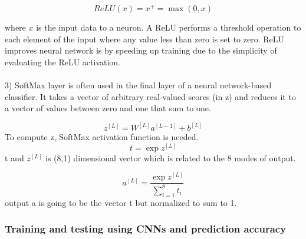 \begin{equation}
ReLU(x) = x^{+} = \max(0,x) 
\end{equation}

where $x$ is the input data to a neuron. A ReLU performs a threshold operation
to each element of the input where any value less than zero is set to zero. ReLU improves neural network is by speeding up training due to the simplicity of evaluating the ReLU activation.
\\
\\
3) SoftMax layer \cite{Ref29} is often used in the final layer of a neural network-based classifier.  It takes a vector of arbitrary real-valued scores (in z) and reduces it to a vector of values between zero and one that sum to one.

\begin{equation}
z^{[L]}=W^{[L]}a^{[L-1]}+b^{[L]} 
\end{equation}
To compute z, SoftMax activation function is needed.
\begin{equation}
t = \exp z^{[L]}
\end{equation}
t and $z^{[L]}$ is (8,1) dimensional vector which is related to the 8 modes of output.

\begin{equation}
a^{[L]} = \frac{\exp z^{[L]}}{\sum_{i=1}^{8} t_i} 
\end{equation}
output a is going to be the vector t but normalized to sum to 1.



\subsubsection{Training and testing using CNNs and prediction accuracy}
\label{subsubsec3}

